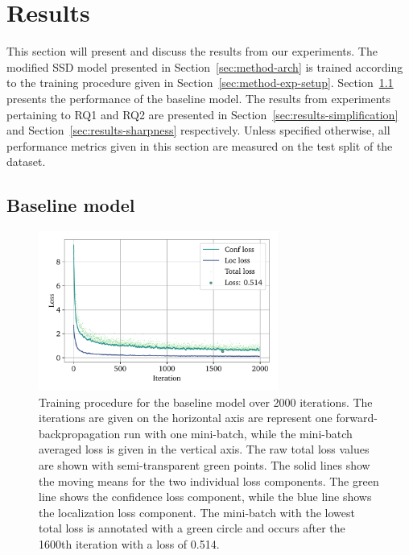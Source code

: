 \chapter{Results}\label{cha:results}

This section will present and discuss the results from our experiments.
The modified SSD model presented in Section~\ref{sec:method-arch} is trained according to the training procedure given in Section~\ref{sec:method-exp-setup}.
Section~\ref{sec:results-baseline} presents the performance of the baseline model. 
The results from experiments pertaining to RQ1 and RQ2 are presented in Section~\ref{sec:results-simplification} and Section~\ref{sec:results-sharpness} respectively.
Unless specified otherwise, all performance metrics given in this section are measured on the test split of the dataset.

\section{Baseline model}\label{sec:results-baseline}
\begin{figure}[htb]
    \centering
    \includegraphics[width=0.7\textwidth]{figs/method/baseline/loss2.pdf}
    \caption[Baseline training procedure]{%
Training procedure for the baseline model over 2000 iterations.
The iterations are given on the horizontal axis are represent one forward-backpropagation run with one mini-batch, while the mini-batch averaged loss is given in the vertical axis.
The raw total loss values are shown with semi-transparent green points.
The solid lines show the moving means for the two individual loss components.
The green line shows the confidence loss component, while the blue line shows the localization loss component.
The mini-batch with the lowest total loss is annotated with a green circle and occurs after the 1600th iteration with a loss of 0.514.
    }\label{fig:method-baseline-loss}
  \end{figure}

